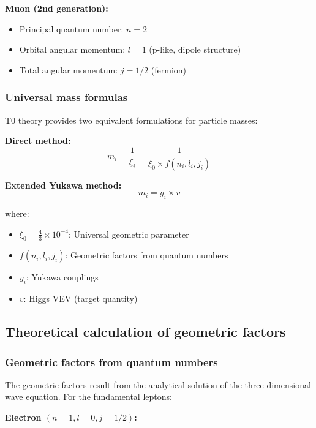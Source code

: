 \documentclass[12pt,a4paper]{article}
\begin{document}
\textbf{Muon (2nd generation):}
\begin{itemize}
	\item Principal quantum number: $n = 2$
	\item Orbital angular momentum: $l = 1$ (p-like, dipole structure)
	\item Total angular momentum: $j = 1/2$ (fermion)
\end{itemize}

\subsubsection{Universal mass formulas}

T0 theory provides two equivalent formulations for particle masses:

\textbf{Direct method:}
\begin{equation}
	m_i = \frac{1}{\xi_i} = \frac{1}{\xi_0 \times f(n_i, l_i, j_i)}
	\label{eq:direct_mass_formula}
\end{equation}

\textbf{Extended Yukawa method:}
\begin{equation}
	m_i = y_i \times v
	\label{eq:yukawa_mass_formula}
\end{equation}

where:
\begin{itemize}
	\item $\xi_0 = \frac{4}{3} \times 10^{-4}$: Universal geometric parameter
	\item $f(n_i, l_i, j_i)$: Geometric factors from quantum numbers
	\item $y_i$: Yukawa couplings
	\item $v$: Higgs VEV (target quantity)
\end{itemize}

\subsection{Theoretical calculation of geometric factors}

\subsubsection{Geometric factors from quantum numbers}

The geometric factors result from the analytical solution of the three-dimensional wave equation. For the fundamental leptons:

\textbf{Electron $(n=1, l=0, j=1/2)$:}
\end{document}
